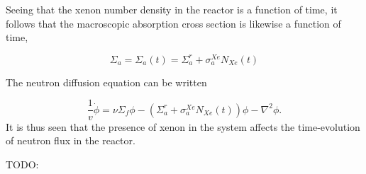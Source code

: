 Seeing that the xenon number density in the reactor is a function of time, it follows that the macroscopic absorption cross section is likewise a function of time,

\begin{equation}
    \Sigma_a = \Sigma_a(t) = \Sigma_a^r + \sigma_a^{Xe}N_{Xe}(t)
\end{equation}

The neutron diffusion equation can be written

\begin{equation}
\frac{1}{v} \dot{\phi} = \nu\Sigma_f\phi - ( \Sigma_a^r + \sigma_a^{Xe}N_{Xe}(t)) \phi - \nabla^2\phi.
\end{equation}It is thus seen that the presence of xenon in the system affects the time-evolution of neutron flux in the reactor. 

TODO: 



